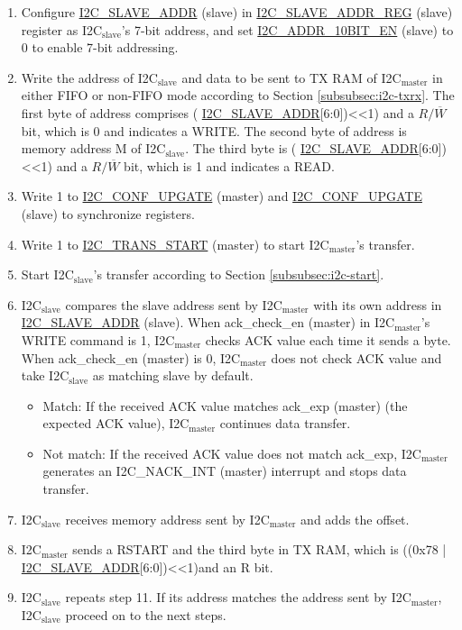 \documentclass[main\_\_EN.tex]{subfiles}
\begin{document}
\begin{enumerate}
\item Configure \hyperref[fielddesc:I2CSLAVEADDR]{I2C\_SLAVE\_ADDR} (slave) in \hyperref[regdesc:I2CSLAVEADDRREG]{I2C\_SLAVE\_ADDR\_REG} (slave) register as I2C$_\text{slave}$'s 7-bit address, and set \hyperref[fielddesc:I2CADDR10BITEN]{I2C\_ADDR\_10BIT\_EN} (slave) to 0 to enable 7-bit addressing.
\item Write the address of I2C$_\text{slave}$ and data to be sent to TX RAM of I2C$_\text{master}$ in either FIFO or non-FIFO mode according to Section \ref{subsubsec:i2c-txrx}. The first byte of address comprises ( \hyperref[fielddesc:I2CSLAVEADDR]{I2C\_SLAVE\_ADDR}[6:0])<<1) and a $R/\overline W$ bit, which is 0 and indicates a WRITE. The second byte of address is memory address M of I2C$_\text{slave}$. The third byte is ( \hyperref[fielddesc:I2CSLAVEADDR]{I2C\_SLAVE\_ADDR}[6:0])<<1) and a $R/\overline W$ bit, which is 1 and indicates a READ.

\item Write 1 to \hyperref[fielddesc:I2CCONFUPGATE]{I2C\_CONF\_UPGATE} (master) and \hyperref[fielddesc:I2CCONFUPGATE]{I2C\_CONF\_UPGATE} (slave) to synchronize registers.
\item Write 1 to \hyperref[fielddesc:I2CTRANSSTART]{I2C\_TRANS\_START} (master) to start I2C$_\text{master}$'s transfer.
\item Start I2C$_\text{slave}$'s transfer according to Section \ref{subsubsec:i2c-start}.
\item I2C$_\text{slave}$ compares the slave address sent by I2C$_\text{master}$ with its own address in \hyperref[fielddesc:I2CSLAVEADDR]{I2C\_SLAVE\_ADDR} (slave). When ack\_check\_en (master) in I2C$_\text{master}$'s WRITE command is 1, I2C$_\text{master}$ checks ACK value each time it sends a byte. When ack\_check\_en (master) is 0, I2C$_\text{master}$ does not check ACK value and take I2C$_\text{slave}$ as matching slave by default.
\begin{itemize}
\item Match: If the received ACK value matches ack\_exp (master) (the expected ACK value), I2C$_\text{master}$ continues data transfer.
\item Not match: If the received ACK value does not match ack\_exp, I2C$_\text{master}$ generates an I2C\_NACK\_INT (master) interrupt and stops data transfer.
\end{itemize}
\item I2C$_\text{slave}$ receives memory address sent by I2C$_\text{master}$ and adds the offset.
\item I2C$_\text{master}$ sends a RSTART and the third byte in TX RAM, which is ((0x{}78 | \hyperref[fielddesc:I2CSLAVEADDR]{I2C\_SLAVE\_ADDR}[6:0])<<1)and an R bit.
\item I2C$_\text{slave}$ repeats step 11. If its address matches the address sent by I2C$_\text{master}$, I2C$_\text{slave}$ proceed on to the next steps.


\end{enumerate}
\end{document}
